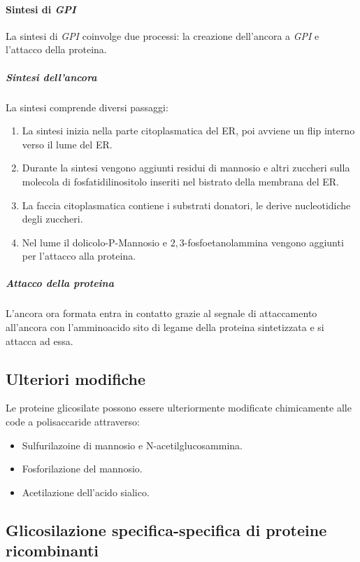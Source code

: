 			\paragraph{Sintesi di \emph{GPI}}
			La sintesi di \emph{GPI} coinvolge due processi: la creazione dell'ancora a \emph{GPI} e l'attacco della proteina.

				\subparagraph{Sintesi dell'ancora}
				La sintesi comprende diversi passaggi:
				\begin{multicols}{2}
					\begin{enumerate}
						\item La sintesi inizia nella parte citoplasmatica del ER, poi avviene un flip interno verso il lume del ER.
						\item Durante la sintesi vengono aggiunti residui di mannosio e altri zuccheri sulla molecola di fosfatidilinositolo inseriti nel bistrato della membrana del ER.
						\item La faccia citoplasmatica contiene i substrati donatori, le derive nucleotidiche degli zuccheri.
						\item Nel lume il dolicolo-P-Mannosio e $2,3$-fosfoetanolammina vengono aggiunti per l'attacco alla proteina.
					\end{enumerate}
				\end{multicols}

				\subparagraph{Attacco della proteina}
				L'ancora ora formata entra in contatto grazie al segnale di attaccamento all'ancora con l'amminoacido sito di legame della proteina sintetizzata e si attacca ad essa.

	\subsection{Ulteriori modifiche}
	Le proteine glicosilate possono essere ulteriormente modificate chimicamente alle code a polisaccaride attraverso:
	\begin{itemize}
		\item Sulfurilazoine di mannosio e N-acetilglucosammina.
		\item Fosforilazione del mannosio.
		\item Acetilazione dell'acido sialico.
	\end{itemize}
	
	\subsection{Glicosilazione specifica-specifica di proteine ricombinanti}
